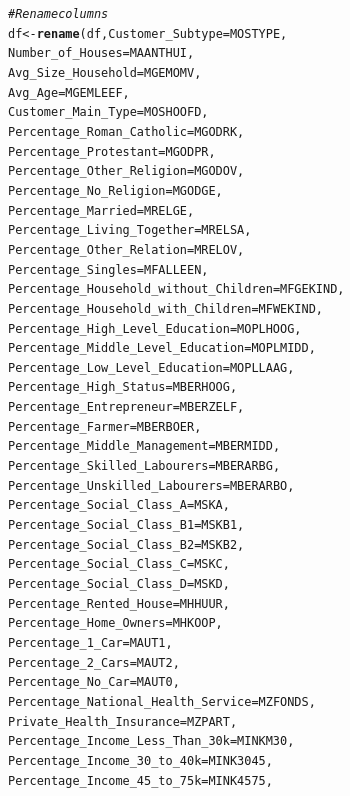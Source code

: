 \documentclass{article}\usepackage[]{graphicx}\usepackage[]{color}
\makeatletter
\newcommand{\hlcom}[1]{\textcolor[rgb]{0.678,0.584,0.686}{\textit{#1}}}%
\newcommand{\hlstd}[1]{\textcolor[rgb]{0.345,0.345,0.345}{#1}}%
\newcommand{\hlkwb}[1]{\textcolor[rgb]{0.69,0.353,0.396}{#1}}%
\newcommand{\hlkwc}[1]{\textcolor[rgb]{0.333,0.667,0.333}{#1}}%
\newcommand{\hlkwd}[1]{\textcolor[rgb]{0.737,0.353,0.396}{\textbf{#1}}}%
\newenvironment{kframe}{%
 \def\at@end@of@kframe{}%
 \ifinner\ifhmode%
  \def\at@end@of@kframe{\end{minipage}}%
  \begin{minipage}{\columnwidth}%
 \fi\fi%
 \def\FrameCommand##1{\hskip\@totalleftmargin \hskip-\fboxsep
 \colorbox{shadecolor}{##1}\hskip-\fboxsep
     \hskip-\linewidth \hskip-\@totalleftmargin \hskip\columnwidth}%
 \MakeFramed {\advance\hsize-\width
   \@totalleftmargin\z@ \linewidth\hsize
   \@setminipage}}%
 {\par\unskip\endMakeFramed%
 \at@end@of@kframe}
\newenvironment{knitrout}{}{} %
\makeatother
\begin{document}
\begin{knitrout}
\color{fgcolor}\begin{kframe}
\begin{alltt}
\hlcom{#Rename columns }
\hlstd{df}\hlkwb{<-}\hlkwd{rename}\hlstd{(df,}\hlkwc{Customer_Subtype}\hlstd{=MOSTYPE,}
           \hlkwc{Number_of_Houses}\hlstd{=MAANTHUI,}
           \hlkwc{Avg_Size_Household}\hlstd{=MGEMOMV,}
           \hlkwc{Avg_Age}\hlstd{=MGEMLEEF,}
           \hlkwc{Customer_Main_Type}\hlstd{=MOSHOOFD,}
           \hlkwc{Percentage_Roman_Catholic}\hlstd{=MGODRK,}
           \hlkwc{Percentage_Protestant}\hlstd{=MGODPR,}
           \hlkwc{Percentage_Other_Religion}\hlstd{=MGODOV,}
           \hlkwc{Percentage_No_Religion}\hlstd{=MGODGE,}
           \hlkwc{Percentage_Married}\hlstd{=MRELGE,}
           \hlkwc{Percentage_Living_Together}\hlstd{=MRELSA,}
           \hlkwc{Percentage_Other_Relation}\hlstd{=MRELOV,}
           \hlkwc{Percentage_Singles}\hlstd{=MFALLEEN,}
           \hlkwc{Percentage_Household_without_Children}\hlstd{=MFGEKIND,}
           \hlkwc{Percentage_Household_with_Children}\hlstd{=MFWEKIND,}
           \hlkwc{Percentage_High_Level_Education}\hlstd{=MOPLHOOG,}
           \hlkwc{Percentage_Middle_Level_Education}\hlstd{=MOPLMIDD,}
           \hlkwc{Percentage_Low_Level_Education}\hlstd{=MOPLLAAG,}
           \hlkwc{Percentage_High_Status}\hlstd{=MBERHOOG,}
           \hlkwc{Percentage_Entrepreneur}\hlstd{=MBERZELF,}
           \hlkwc{Percentage_Farmer}\hlstd{=MBERBOER,}
           \hlkwc{Percentage_Middle_Management}\hlstd{=MBERMIDD,}
           \hlkwc{Percentage_Skilled_Labourers}\hlstd{=MBERARBG,}
           \hlkwc{Percentage_Unskilled_Labourers}\hlstd{=MBERARBO,}
           \hlkwc{Percentage_Social_Class_A}\hlstd{=MSKA,}
           \hlkwc{Percentage_Social_Class_B1}\hlstd{=MSKB1,}
           \hlkwc{Percentage_Social_Class_B2}\hlstd{=MSKB2,}
           \hlkwc{Percentage_Social_Class_C}\hlstd{=MSKC,}
           \hlkwc{Percentage_Social_Class_D}\hlstd{=MSKD,}
           \hlkwc{Percentage_Rented_House}\hlstd{=MHHUUR,}
           \hlkwc{Percentage_Home_Owners}\hlstd{=MHKOOP,}
           \hlkwc{Percentage_1_Car}\hlstd{=MAUT1,}
           \hlkwc{Percentage_2_Cars}\hlstd{=MAUT2,}
           \hlkwc{Percentage_No_Car}\hlstd{=MAUT0,}
           \hlkwc{Percentage_National_Health_Service}\hlstd{=MZFONDS,}
           \hlkwc{Private_Health_Insurance}\hlstd{=MZPART,}
           \hlkwc{Percentage_Income_Less_Than_30k}\hlstd{=MINKM30,}
           \hlkwc{Percentage_Income_30_to_40k}\hlstd{=MINK3045,}
           \hlkwc{Percentage_Income_45_to_75k}\hlstd{=MINK4575,}

\end{alltt}
\end{kframe}
\end{knitrout}
\end{document}

